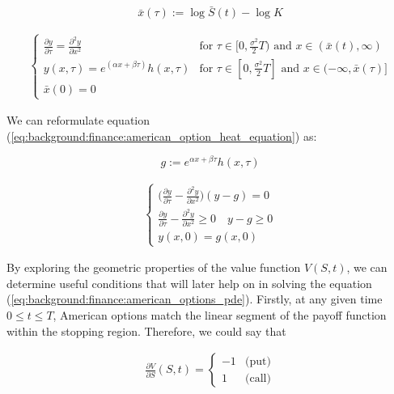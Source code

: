 \begin{equation}
  \bar{x}(\tau) := \log{\bar{S}(t)} - \log{K} 
\end{equation}

\begin{align}
  \begin{cases}
    \frac{\partial y}{\partial \tau} = \frac{\partial^2 y}{\partial x^2} & \text{for $\tau\in[0,\frac{\sigma^2}{2}T)$ and $x\in(\bar{x}(t), \infty)$} \\
    y(x, \tau) = e^{(\alpha x + \beta \tau)}h(x, \tau) & \text{for $\tau\in[0, \frac{\sigma^2}{2}T]$ and $x\in(-\infty, \bar{x}(\tau)]$} \\
    \bar{x}(0) = 0
  \end{cases}
  \label{eq:background:finance:american_option_heat_equation}
\end{align}

We can reformulate equation (\ref*{eq:background:finance:american_option_heat_equation})
as:

\begin{equation}
  g := e^{\alpha x + \beta \tau}h(x, \tau)
\end{equation}

\begin{align}
  \begin{cases}
    \big(\frac{\partial y}{\partial \tau} - \frac{\partial^2 y}{\partial x^2}\big)(y  - g) =0 \\
    \frac{\partial y}{\partial \tau} - \frac{\partial^2 y}{\partial x^2} \ge 0 \quad y - g \ge 0 \\
    y(x, 0) = g(x, 0)
  \end{cases}
\end{align}


By exploring the geometric properties of the value function $V(S,t)$, 
we can determine useful conditions that will later help on in solving the equation 
(\ref*{eq:background:finance:american_options_pde}). Firstly, at
any given time $0 \le t \le T$, American options match the linear segment of the payoff
function within the stopping region. Therefore, we could say that 

\begin{align}
  \frac{\partial V}{\partial S}(S, t) =  \begin{cases}
    -1 & \text{(put)} \\ 
    1 & \text{(call)}
  \end{cases}
  \label{eq:background:finance:american_option_left_boundary}
\end{align}

